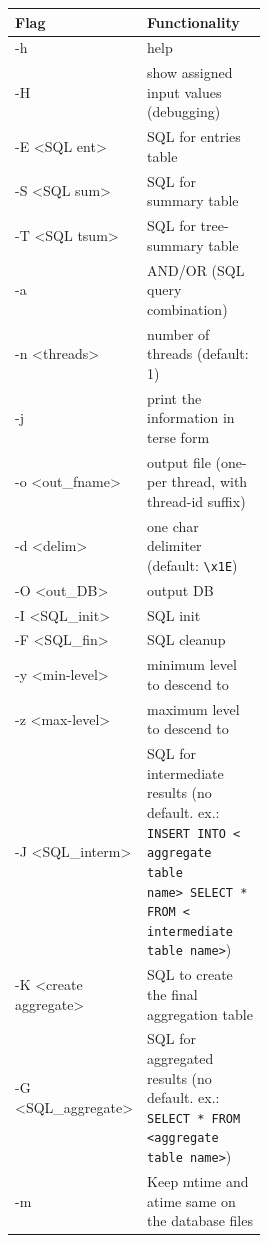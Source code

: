 \begin{table} [H]
  \centering
  \begin{tabular*}{\linewidth}{l|p{0.5\linewidth}}
    Flag & Functionality \\
    \hline
    -h & help \\
    \hline
    -H & show assigned input values (debugging) \\
    \hline
    -E \textless SQL ent\textgreater & SQL for entries table \\
    \hline
    -S \textless SQL sum\textgreater & SQL for summary table \\
    \hline
    -T \textless SQL tsum\textgreater & SQL for tree-summary table \\
    \hline
    -a & AND/OR (SQL query combination) \\
    \hline
    -n \textless threads\textgreater & number of threads (default: 1) \\
    \hline
    -j & print the information in terse form \\
    \hline
    -o \textless out\_fname\textgreater & output file (one-per thread, with thread-id suffix) \\
    \hline
    -d \textless delim\textgreater & one char delimiter (default: \texttt{\textbackslash x1E}) \\
    \hline
    -O \textless out\_DB\textgreater & output DB \\
    \hline
    -I \textless SQL\_init\textgreater & SQL init \\
    \hline
    -F \textless SQL\_fin\textgreater & SQL cleanup \\
    \hline
    -y \textless min-level\textgreater & minimum level to descend to \\
    \hline
    -z \textless max-level\textgreater & maximum level to descend to \\
    \hline
    -J \textless SQL\_interm\textgreater & SQL for intermediate
    results (no default. ex.: \texttt{INSERT INTO \textless
      aggregate table name\textgreater \ SELECT * FROM \textless
      intermediate table name\textgreater}) \\
    \hline
    -K \textless create aggregate\textgreater & SQL to create the final aggregation table \\
    \hline
    -G \textless SQL\_aggregate\textgreater & SQL for aggregated
    results (no default. ex.: \texttt{SELECT * FROM
      \textless aggregate table name\textgreater}) \\
    \hline
    -m & Keep mtime and atime same on the database files \\

\end{tabular*}
\end{table}
